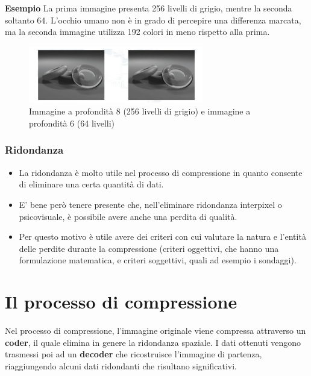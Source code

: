 \textbf{Esempio}
La prima immagine presenta 256 livelli di grigio, mentre la seconda soltanto 64.
L'occhio umano non è in grado di percepire una differenza marcata, ma la seconda immagine utilizza
192 colori in meno rispetto alla prima.

\begin{figure}[H]
    \centering
    \includegraphics[width=\linewidth, keepaspectratio]{capitoli/immagini/imgs/ridondanza-psicovisuale.png}
    \caption{Immagine a profondità 8 (256 livelli di grigio) e immagine a
        profondità 6 (64 livelli)}
\end{figure}

\subsubsection{Ridondanza}
\begin{itemize}
    \item La ridondanza è molto utile nel processo di compressione in
          quanto consente di eliminare una certa quantità di dati.
    \item E' bene però tenere presente che, nell'eliminare ridondanza
          interpixel o psicovisuale, è possibile avere anche una perdita di
          qualità.
    \item Per questo motivo è utile avere dei criteri con cui valutare la
          natura e l'entità delle perdite durante la compressione (criteri
          oggettivi, che hanno una formulazione matematica, e criteri soggettivi, quali ad esempio i sondaggi).
\end{itemize}

\section{Il processo di compressione}
Nel processo di compressione, l'immagine originale viene compressa
attraverso un \textbf{coder}, il quale elimina in genere la ridondanza spaziale.
I dati ottenuti vengono trasmessi poi ad un \textbf{decoder} che
ricostruisce l'immagine di partenza, riaggiungendo alcuni dati ridondanti che risultano significativi.